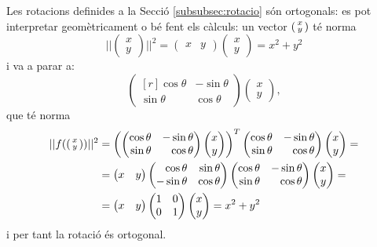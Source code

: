 \begin{exemple}
Les rotacions definides a la Secció \ref{subsubsec:rotacio} són ortogonals: es pot interpretar geomètricament o bé fent els càlculs: un vector $\left(\begin{smallmatrix}x\\y\end{smallmatrix}\right)$ té norma
\[
||\begin{pmatrix}x \\ y \end{pmatrix}||^2=\begin{pmatrix} x & y \end{pmatrix}\begin{pmatrix} x \\ y \end{pmatrix} = x^2+y^2
\]
i va a parar a:
\[
\begin{pmatrix*}[r]
\cos\theta&-\sin\theta\\
\sin\theta&\cos\theta
\end{pmatrix*}
\begin{pmatrix}x \\ y \end{pmatrix} ,
\]
que té norma
\begin{align*}
||f(\smat{x\\y})||^2 & =\left( \begin{pmatrix*}[r]
\cos\theta&-\sin\theta\\
\sin\theta&\cos\theta
\end{pmatrix*}
\begin{pmatrix}x \\ y \end{pmatrix}  \right)^T
\begin{pmatrix*}[r]
\cos\theta&-\sin\theta\\
\sin\theta&\cos\theta
\end{pmatrix*}
\begin{pmatrix}x \\ y \end{pmatrix} = \\
& = \begin{pmatrix}x &  y \end{pmatrix}
\begin{pmatrix*}[r]
\cos\theta&\sin\theta\\
-\sin\theta&\cos\theta
\end{pmatrix*}
\begin{pmatrix*}[r]
\cos\theta&-\sin\theta\\
\sin\theta&\cos\theta
\end{pmatrix*}
\begin{pmatrix}x \\ y \end{pmatrix} = \\
& = \begin{pmatrix}x &  y \end{pmatrix}
\begin{pmatrix*}[r]
1&0\\
0&1
\end{pmatrix*}
\begin{pmatrix}x \\ y \end{pmatrix} = x^2+y^2\\
\end{align*} 
i per tant la rotació és ortogonal.
\end{exemple}
